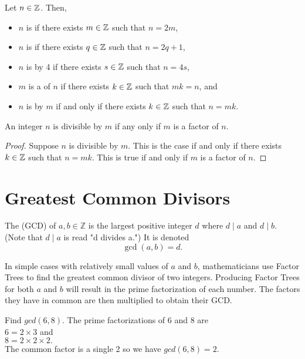 \begin{definition}  Let $n\in\mathbb{Z}$.  Then, 
\begin{itemize}
\item $n$ is  if there exists $m\in\mathbb{Z}$ such that $n=2m$,
\item $n$ is  if there exists $q\in \mathbb{Z}$ such that $n=2q+1$,
\item $n$ is  by 4 if there exists $s\in\mathbb{Z}$ such that $n=4s$,
\item $m$ is a  of $n$ if there exists $k \in \mathbb{Z}$ such that $mk=n$, and
\item $n$ is  by $m$ if and only if there exists $k \in \mathbb{Z}$ such that $n=mk$.
\end{itemize}
\end{definition}

\begin{proposition} An integer $n$ is divisible by $m$ if any only if $m$ is a factor of $n$.
\end{proposition}

\begin{proof}  Suppose $n$ is divisible by $m$.  This is the case if and only if there exists $k \in \mathbb{Z}$ such that $n = mk$.  This is true if and only if $m$ is a factor of $n$.\end{proof}

\section{Greatest Common Divisors}


\begin{definition} The  (GCD) of
    $a, b \in \mathbb{Z}$
    is the largest positive integer $d$ where 
    $d \mid a$ and  $d \mid b.$ \\
    \indent\indent\indent(Note that $d \mid a$ is read "d divides a.")  It is denoted
    \[\gcd(a, b) = d.\]
\end{definition}

In simple cases with relatively small values of $a$ and $b$, mathematicians use Factor Trees to find the greatest common divisor of two integers. Producing Factor Trees for both $a$ and $b$ will result in the prime factorization of each number. The factors they have in common are then multiplied to obtain their GCD.


\begin{example} Find $gcd(6, 8)$.
\center The prime factorizations of 6 and 8 are \\
$6 = 2 \times 3$ and \\
$8 = 2 \times 2 \times 2.$ 
\\The common factor is a single 2 so we have $gcd(6, 8) = 2$.
\end{example}


